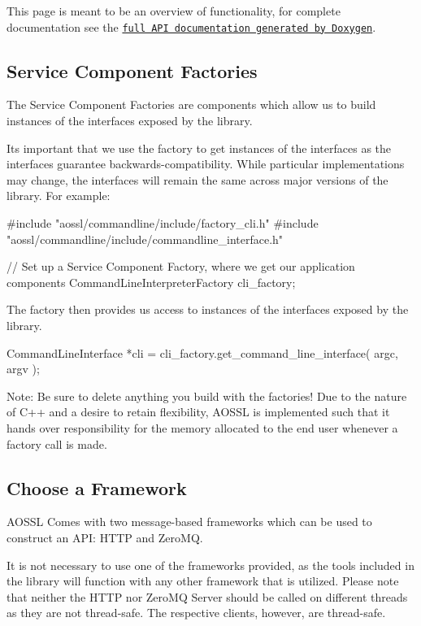 This page is meant to be an overview of functionality, for complete documentation see the \href{https://github.com/AO-StreetArt/AOSharedServiceLibrary/tree/master/docs/html}{\tt full A\+PI documentation generated by Doxygen}.

\subsection*{Service Component Factories}

The Service Component Factories are components which allow us to build instances of the interfaces exposed by the library.

It\textquotesingle{}s important that we use the factory to get instances of the interfaces as the interfaces guarantee backwards-\/compatibility. While particular implementations may change, the interfaces will remain the same across major versions of the library. For example\+: \begin{DoxyVerb}#include "aossl/commandline/include/factory_cli.h"
#include "aossl/commandline/include/commandline_interface.h"

// Set up a Service Component Factory, where we get our application components
CommandLineInterpreterFactory cli_factory;
\end{DoxyVerb}


The factory then provides us access to instances of the interfaces exposed by the library. \begin{DoxyVerb}CommandLineInterface *cli = cli_factory.get_command_line_interface( argc, argv );
\end{DoxyVerb}


Note\+: Be sure to delete anything you build with the factories! Due to the nature of C++ and a desire to retain flexibility, A\+O\+S\+SL is implemented such that it hands over responsibility for the memory allocated to the end user whenever a factory call is made.

\subsection*{Choose a Framework}

A\+O\+S\+SL Comes with two message-\/based frameworks which can be used to construct an A\+PI\+: H\+T\+TP and Zero\+MQ.

It is not necessary to use one of the frameworks provided, as the tools included in the library will function with any other framework that is utilized. Please note that neither the H\+T\+TP nor Zero\+MQ Server should be called on different threads as they are not thread-\/safe. The respective clients, however, are thread-\/safe.


